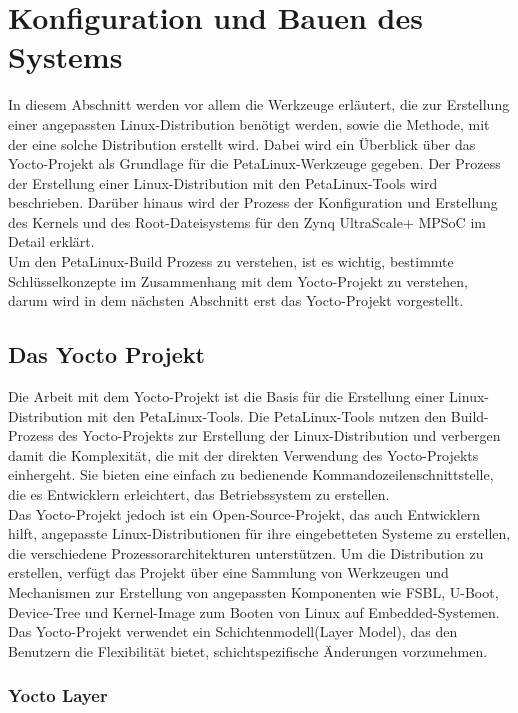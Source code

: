 \section{Konfiguration und Bauen des Systems}
\label{cha:ver:sec:Konfiguration_und bauen_system}

In diesem Abschnitt werden vor allem die Werkzeuge erläutert, die zur Erstellung einer angepassten Linux-Distribution benötigt werden, sowie die Methode, mit der eine solche Distribution erstellt wird. Dabei wird ein Überblick über das Yocto-Projekt als Grundlage für die PetaLinux-Werkzeuge gegeben. Der Prozess der Erstellung einer Linux-Distribution mit den PetaLinux-Tools wird beschrieben. Darüber hinaus wird der Prozess der Konfiguration und Erstellung des Kernels und des Root-Dateisystems für den Zynq UltraScale+ MPSoC im Detail erklärt. \\
Um den PetaLinux-Build Prozess zu verstehen, ist es wichtig, bestimmte Schlüsselkonzepte im Zusammenhang mit dem Yocto-Projekt zu verstehen, darum wird in dem nächsten Abschnitt erst das Yocto-Projekt vorgestellt. 

\subsection{Das Yocto Projekt}

Die Arbeit mit dem Yocto-Projekt ist die Basis für die Erstellung einer Linux-Distribution mit den PetaLinux-Tools. Die PetaLinux-Tools nutzen den Build-Prozess des Yocto-Projekts zur Erstellung der Linux-Distribution und verbergen damit die Komplexität, die mit der direkten Verwendung des Yocto-Projekts einhergeht. Sie bieten eine einfach zu bedienende Kommandozeilenschnittstelle, die es Entwicklern erleichtert, das Betriebssystem zu erstellen. \\
Das Yocto-Projekt jedoch  ist ein Open-Source-Projekt, das auch Entwicklern hilft, angepasste Linux-Distributionen für ihre eingebetteten Systeme zu erstellen, die verschiedene Prozessorarchitekturen unterstützen. Um die Distribution zu erstellen, verfügt das Projekt über eine Sammlung von Werkzeugen und Mechanismen zur Erstellung von angepassten Komponenten wie FSBL, U-Boot, Device-Tree und Kernel-Image zum Booten von Linux auf Embedded-Systemen.\\
Das Yocto-Projekt verwendet ein Schichtenmodell(Layer Model), das den Benutzern die Flexibilität bietet, schichtspezifische Änderungen vorzunehmen. 

\subsubsection{Yocto Layer}

